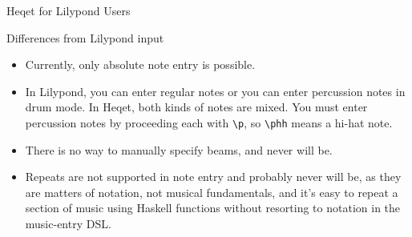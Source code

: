 \documentclass{article}
\begin{document}
\begin{section}{Heqet for Lilypond Users}
\begin{subsection}{Differences from Lilypond input}
\begin{itemize}
A Lilypond command is separately recorded on every note it's applied to. At the moment, no effort is made to combine notes with a certain command into a single instance of that command with a long music argument upon rendering. This will be required for rendering octava marks correctly, and may improve performance, so future versions of Heqet may include a way to mark whether a command must, can, or shouldn't be combined.

A warning: although it is possible to insert arbitrary Lilypond code into a Heqet music value, please take care, as rearranging the notes of a heavily-tweaked piece of music might have unexpected effects, as Heqet currently has no understanding of the meanings of Lilypond commands.

\item Currently, only absolute note entry is possible. 

\item In Lilypond, you can enter regular notes or you can enter percussion notes in drum mode. In Heqet, both kinds of notes are mixed. You must enter percussion notes by proceeding each with \verb+\p+, so \verb+\phh+ means a hi-hat note. 

\item There is no way to manually specify beams, and never will be.

\item Repeats are not supported in note entry and probably never will be, as they are matters of notation, not musical fundamentals, and it's easy to repeat a section of music using Haskell functions without resorting to notation in the music-entry DSL.

\end{itemize}
\end{subsection}
\end{section}
\end{document}

